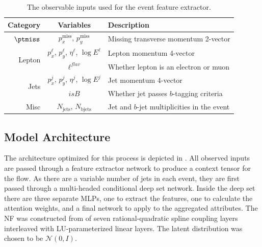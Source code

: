 \begin{table}[ht]
    \caption{The observable inputs used for the event feature extractor.}
    \label{tab:inputs}
    \centering
    \begin{tabular}{r c l}
    \toprule
    Category & Variables & Description\\
    \midrule
    $\ptmiss$ & $p_x^\text{miss}$, $p_y^\text{miss}$ & Missing transverse momentum 2-vector \\ [2ex]
    \multirow{2}{*}{Lepton} & $p_x^{\ell}$, $p_y^{\ell}$, $\eta^\ell$, $\log E^\ell$ & Lepton momentum 4-vector \\
    & $\ell^{flav}$ &  Whether lepton is an electron or muon \\ [2ex]
    \multirow{2}{*}{Jets} & $p_x^{j}$, $p_y^j$, $\eta^j$,  $\log E^j$ & Jet momentum 4-vector \\
    & $isB$ &  Whether jet passes $b$-tagging criteria \\ [2ex]
    Misc & $N_{\text{jets}}$, $N_{\text{bjets}}$ & Jet and $b$-jet multiplicities in the event\\
    \bottomrule
    \end{tabular}
\end{table}

\subsection{Model Architecture}

The \vflows architecture optimized for this process is depicted in .
All observed inputs are passed through a feature extractor network to produce a context tensor for the flow.
As there are a variable number of jets in each event, they are first passed through a multi-headed conditional deep set network.
Inside the deep set there are three separate MLPs, one to extract the features, one to calculate the attention weights, and a final network to apply to the aggregated attributes.
The NF was constructed from of seven rational-quadratic spline coupling layers~\cite{NeuralSplineFlows} interleaved with LU-parameterized linear layers.
The latent distribution was chosen to be $\mathcal{N}(0, I)$.

